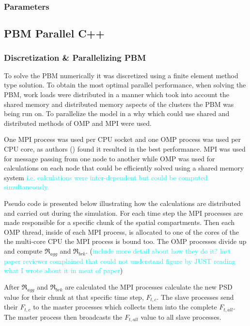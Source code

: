 \documentclass[preprint,11pt,authoryear]{elsarticle}
\begin{document}
    \subsubsection{Parameters}
    
    
  \subsection{PBM Parallel C++}
    \subsubsection{Discretization \& Parallelizing PBM}
    \par To solve the PBM numerically it was discretized using a finite element method type solution. To obtain the most optimal parallel performance, when solving the PBM, work loads were distributed in a manner which took into account the shared memory and distributed memory aspects of the clusters the PBM was being run on. To parallelize the model in a why which could use shared and distributed methods of OMP and MPI were used. 
    \par One MPI process was used per CPU socket and one OMP process was used per CPU core, as authors (\cite{Bettencourt2017}) found it resulted in the best performance. MPI was used for message passing from one node to another while OMP was used for calculations on each node that could be efficiently solved using a shared memory system \textcolor{cyan}{i.e. calculations were inter-dependent but could be computed simultaneously.} 
    \par Pseudo code is presented below illustrating how the calculations are distributed and carried out during the simulation. For each time step the MPI processes are made responsible for a specific chunk of the spatial compartments. Then each OMP thread, inside of each MPI process, is allocated to one of the cores of the the multi-core CPU the MPI process is bound too. The OMP processes divide up and compute $\Re_{agg}$ and $\Re_{brk}$. (\textcolor{cyan}{include more detail about how they do it? last paper reviewer complained that could not understand figure by JUST reading what I wrote about it in meat of paper}) 
    \par After $\Re_{agg}$ and $\Re_{brk}$ are calculated the MPI processes calculate the new PSD value for their chunk at that specific time step, $F_{t,c}$. The slave processes send their $F_{t,c}$ to the master processes which collects them into the complete $F_{t,all}$. The master process then broadcasts the $F_{t,all}$ value to all slave processes. 	
\end{document}
